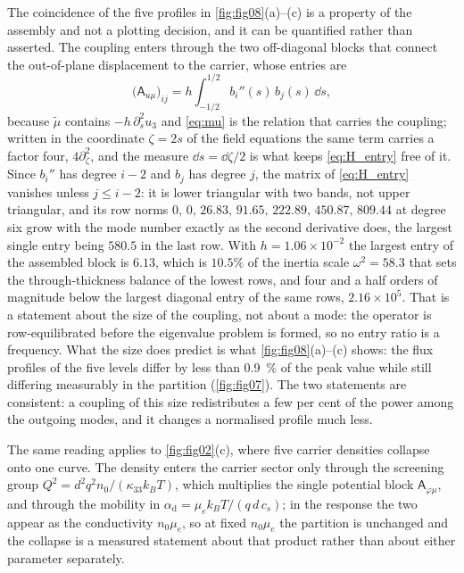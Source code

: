 The coincidence of the five profiles in \cref{fig:fig08}(a)--(c) is a property
of the assembly and not a plotting decision, and it can be quantified rather than
asserted.  The coupling enters through the two off-diagonal blocks that connect
the out-of-plane displacement to the carrier, whose entries are
\begin{equation}
\label{eq:H_entry}
\bigl(\mathsf A_{u\mu}\bigr)_{ij}
=h\int_{-1/2}^{1/2}b_i''(s)\,b_j(s)\,\dd s ,
\end{equation}
because $\widetilde\mu$ contains $-h\,\partial_s^{2}u_3$ and \eqref{eq:mu} is
the relation that carries the coupling; written in the coordinate $\zeta=2s$ of
the field equations the same term carries a factor four, $4\partial_\zeta^{2}$,
and the measure $\dd s=\dd\zeta/2$ is what keeps \eqref{eq:H_entry} free of it.
Since $b_i''$ has degree $i-2$ and $b_j$ has degree $j$, the matrix of
\eqref{eq:H_entry} vanishes unless $j\le i-2$: it is lower triangular with two
bands, not upper triangular, and its row norms
$0,\,0,\,26.83,\,91.65,\,222.89,\,450.87,\,809.44$ at degree six grow with the
mode number exactly as the second derivative does, the largest single entry being
$580.5$ in the last row.  With $h=1.06\times10^{-2}$
the largest entry of the assembled block is $6.13$, which is $10.5\%$ of the
inertia scale $\omega^{2}=58.3$ that sets the through-thickness balance of the
lowest rows, and four and a half orders of magnitude below the largest diagonal
entry of the same rows, $2.16\times10^{5}$.  That is a statement about the size of the
coupling, not about a mode: the operator is row-equilibrated before the
eigenvalue problem is formed, so no entry ratio is a frequency.  What the size
does predict is what \cref{fig:fig08}(a)--(c) shows: the flux profiles of the
five levels differ by less than \SI{0.9}{\percent} of the peak value while still
differing measurably in the partition (\cref{fig:fig07}).  The two statements are
consistent: a coupling of this size redistributes a few per cent of the power
among the outgoing modes, and it changes a normalised profile much less.

The same reading applies to \cref{fig:fig02}(c), where five carrier densities
collapse onto one curve.  The density enters the carrier sector only through the
screening group $Q^{2}=d^{2}q^{2}n_0/(\kappa_{33}k_BT)$, which multiplies the
single potential block $\mathsf A_{\varphi\mu}$, and through the mobility in
$\alpha_{\mathrm d}=\mu_ek_BT/(q\,d\,c_s)$; in the response the two appear as the
conductivity $n_0\mu_e$, so at fixed $n_0\mu_e$ the partition is unchanged and
the collapse is a measured statement about that product rather than about either
parameter separately.

